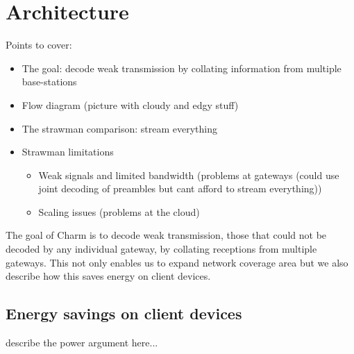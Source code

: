 \section{Architecture}
\label{sec:arch}

{\color{blue} Points to cover:

\begin{itemize}
    \item The goal: decode weak transmission by collating information from multiple base-stations
    \item Flow diagram (picture with cloudy and edgy stuff)
    \item The strawman comparison: stream everything
    \item Strawman limitations
        \begin{itemize}
            \item Weak signals and limited bandwidth (problems at gateways (could use joint decoding of preambles but cant afford to stream everything))
            \item Scaling issues (problems at the cloud)
        \end{itemize}
\end{itemize}
}


The goal of Charm is to decode weak transmission, those that could not be
decoded by any individual gateway, by collating receptions from multiple
gateways. This not only enables us to expand network coverage area but we also
describe how this saves energy on client devices.

\subsection{Energy savings on client devices}

{\color{blue} describe the power argument here...}

